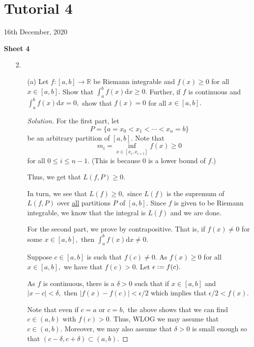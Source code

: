 \documentclass[12pt]{article}
\theoremstyle{definition}
\newenvironment{soln}{\begin{proof}[Solution]}{\end{proof}}
\begin{document}
\newpage\section{Tutorial 4}
\begin{center}
	16th December, 2020
\end{center}
\textbf{Sheet 4}
\begin{itemize}
	\item[2.] \begin{itemize}
		\item[(a)] Let $f:[a, b] \to \mathbb{R}$ be Riemann integrable and $f(x) \ge 0$ for all $x \in [a, b].$ Show that $\displaystyle\int_{a}^{b} f(x) {\mathrm{d}}x \ge 0.$ Further, if $f$ is continuous and $\displaystyle\int_{a}^{b} f(x) {\mathrm{d}}x = 0,$ show that $f(x) = 0$ for all $x \in [a, b].$
		\begin{soln}
			For the first part, let 
			\begin{equation*} 
				P = \{a = x_0 < x_1 < \cdots < x_n = b\}
			\end{equation*}
			be an arbitrary partition of $[a, b].$ Note that
			\begin{equation*} 
				m_i = \inf_{x \in [x_i, x_{i + 1}]}f(x) \ge 0
			\end{equation*}
			for all $0 \le i \le n - 1.$ (This is because $0$ is a lower bound of $f.$)

			Thus, we get that $L(f, P) \ge 0.$

			In turn, we see that $L(f) \ge 0,$ since $L(f)$ is the supremum of $L(f, P)$ over \underline{all} partitions $P$ of $[a, b].$ Since $f$ is given to be Riemann integrable, we know that the integral is $L(f)$ and we are done.
			
			\hrulefill
			
			For the second part, we prove by contrapositive. That is, if $f(x) \neq 0$ for some $x \in [a, b],$ then $\displaystyle\int_{a}^{b} f(x) {\mathrm{d}}x \neq 0.$

			Suppose $c \in [a, b]$ is such that $f(c) \neq 0.$ As $f(x) \ge 0$ for all $x \in [a, b],$ we have that $f(c) > 0.$ Let $\epsilon \vcentcolon= f(c).$

			As $f$ is continuous, there is a $\delta > 0$ such that if $x \in [a, b]$ and $|x - c| < \delta,$ then $|f(x) - f(c)| < \epsilon/2$ which implies that $\epsilon/2 < f(x).$

			Note that even if $c = a$ or $c = b,$ the above shows that we can find $c \in (a, b)$ with $f(c) > 0.$ Thus, WLOG we may assume that $c \in (a, b).$ Moreover, we may also assume that $\delta > 0$ is small enough so that $(c- \delta, c + \delta) \subset (a, b).$


\end{soln}
\end{itemize}
\end{itemize}
\end{document}
